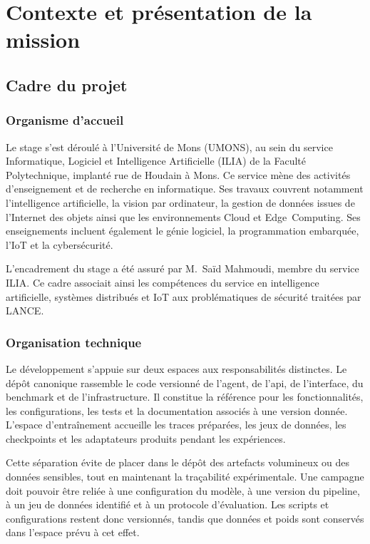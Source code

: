 \chapter{Contexte et présentation de la mission}
\label{chap:contexte}

\section{Cadre du projet}

\subsection{Organisme d'accueil}

Le stage s'est déroulé à l'Université de Mons (UMONS), au sein du service
Informatique, Logiciel et Intelligence Artificielle (ILIA) de la Faculté
Polytechnique, implanté rue de Houdain à Mons. Ce service mène des activités
d'enseignement et de recherche en informatique. Ses travaux couvrent notamment
l'intelligence artificielle, la vision par ordinateur, la gestion de données
issues de l'Internet des objets ainsi que les environnements Cloud et
Edge~Computing. Ses enseignements incluent également le génie logiciel, la
programmation embarquée, l'IoT et la cybersécurité.

L'encadrement du stage a été assuré par M.~Saïd Mahmoudi, membre du service
ILIA. Ce cadre associait ainsi les compétences du service
en intelligence artificielle, systèmes distribués et IoT aux problématiques de
sécurité traitées par LANCE.

\subsection{Organisation technique}

Le développement s'appuie sur deux espaces aux responsabilités distinctes. Le
dépôt canonique rassemble le code versionné de l'agent, de l'\gls{api}, de
l'interface, du benchmark et de l'infrastructure. Il constitue la référence pour
les fonctionnalités, les configurations, les tests et la documentation associés
à une version donnée. L'espace d'entraînement accueille les traces préparées,
les jeux de données, les checkpoints et les adaptateurs produits pendant les
expériences.

Cette séparation évite de placer dans le dépôt des artefacts volumineux ou des
données sensibles, tout en maintenant la traçabilité expérimentale. Une
campagne doit pouvoir être reliée à une configuration du modèle, à une version
du pipeline, à un jeu de données identifié et à un protocole d'évaluation.
Les scripts et configurations restent donc versionnés, tandis que données et
poids sont conservés dans l'espace prévu à cet effet.

